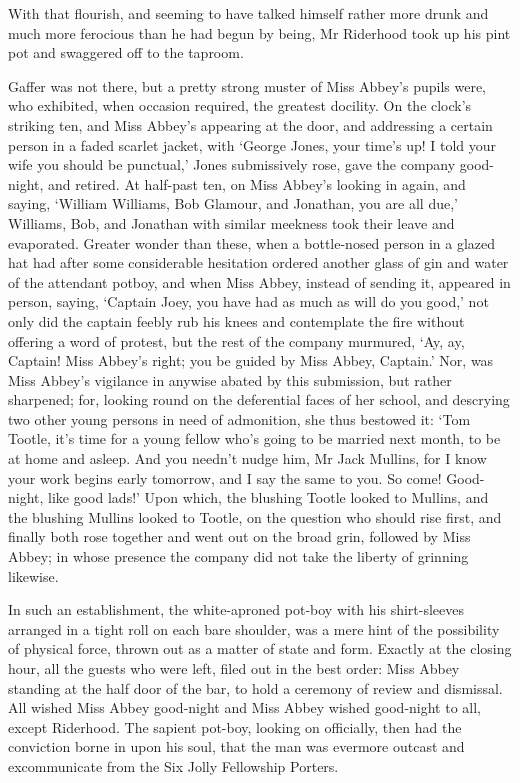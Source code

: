 With that flourish, and seeming to have talked himself rather more drunk
and much more ferocious than he had begun by being, Mr Riderhood took up
his pint pot and swaggered off to the taproom.

Gaffer was not there, but a pretty strong muster of Miss Abbey’s pupils
were, who exhibited, when occasion required, the greatest docility. On
the clock’s striking ten, and Miss Abbey’s appearing at the door, and
addressing a certain person in a faded scarlet jacket, with ‘George
Jones, your time’s up! I told your wife you should be punctual,’
Jones submissively rose, gave the company good-night, and retired. At
half-past ten, on Miss Abbey’s looking in again, and saying, ‘William
Williams, Bob Glamour, and Jonathan, you are all due,’ Williams, Bob,
and Jonathan with similar meekness took their leave and evaporated.
Greater wonder than these, when a bottle-nosed person in a glazed hat
had after some considerable hesitation ordered another glass of gin and
water of the attendant potboy, and when Miss Abbey, instead of sending
it, appeared in person, saying, ‘Captain Joey, you have had as much as
will do you good,’ not only did the captain feebly rub his knees and
contemplate the fire without offering a word of protest, but the rest
of the company murmured, ‘Ay, ay, Captain! Miss Abbey’s right; you
be guided by Miss Abbey, Captain.’ Nor, was Miss Abbey’s vigilance in
anywise abated by this submission, but rather sharpened; for, looking
round on the deferential faces of her school, and descrying two other
young persons in need of admonition, she thus bestowed it: ‘Tom Tootle,
it’s time for a young fellow who’s going to be married next month, to
be at home and asleep. And you needn’t nudge him, Mr Jack Mullins, for
I know your work begins early tomorrow, and I say the same to you.
So come! Good-night, like good lads!’ Upon which, the blushing Tootle
looked to Mullins, and the blushing Mullins looked to Tootle, on the
question who should rise first, and finally both rose together and went
out on the broad grin, followed by Miss Abbey; in whose presence the
company did not take the liberty of grinning likewise.

In such an establishment, the white-aproned pot-boy with his
shirt-sleeves arranged in a tight roll on each bare shoulder, was a mere
hint of the possibility of physical force, thrown out as a matter of
state and form. Exactly at the closing hour, all the guests who were
left, filed out in the best order: Miss Abbey standing at the half door
of the bar, to hold a ceremony of review and dismissal. All wished
Miss Abbey good-night and Miss Abbey wished good-night to all, except
Riderhood. The sapient pot-boy, looking on officially, then had the
conviction borne in upon his soul, that the man was evermore outcast and
excommunicate from the Six Jolly Fellowship Porters.

